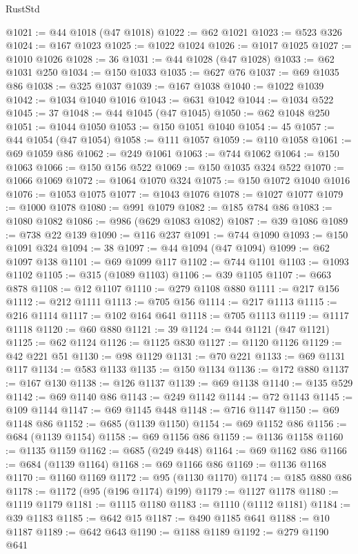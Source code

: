 \begin{lexlean}{RustStd}
\begin{coremodule}
@1021 := @44 @1018 (@47 @1018)
@1022 := @62 @1021
@1023 := @523 @326
@1024 := @167 @1023
@1025 := @1022 @1024
@1026 := @1017 @1025
@1027 := @1010 @1026
@1028 := 36
@1031 := @44 @1028 (@47 @1028)
@1033 := @62 @1031 @250
@1034 := @150 @1033
@1035 := @627 @76
@1037 := @69 @1035 @86
@1038 := @325 @1037
@1039 := @167 @1038
@1040 := @1022 @1039
@1042 := @1034 @1040 @1016
@1043 := @631 @1042
@1044 := @1034 @522
@1045 := 37
@1048 := @44 @1045 (@47 @1045)
@1050 := @62 @1048 @250
@1051 := @1044 @1050
@1053 := @150 @1051 @1040
@1054 := 45
@1057 := @44 @1054 (@47 @1054)
@1058 := @111 @1057
@1059 := @110 @1058
@1061 := @69 @1059 @86
@1062 := @249 @1061
@1063 := @744 @1062
@1064 := @150 @1063
@1066 := @150 @156 @522
@1069 := @150 @1035 @324 @522
@1070 := @1066 @1069
@1072 := @1064 @1070 @324
@1075 := @150 @1072 @1040 @1016
@1076 := @1053 @1075
@1077 := @1043 @1076
@1078 := @1027 @1077
@1079 := @1000 @1078
@1080 := @991 @1079
@1082 := @185 @784 @86
@1083 := @1080 @1082
@1086 := @986 (@629 @1083 @1082)
@1087 := @39 @1086
@1089 := @738 @22 @139
@1090 := @116 @237
@1091 := @744 @1090
@1093 := @150 @1091 @324
@1094 := 38
@1097 := @44 @1094 (@47 @1094)
@1099 := @62 @1097 @138
@1101 := @69 @1099 @117
@1102 := @744 @1101
@1103 := @1093 @1102
@1105 := @315 (@1089 @1103)
@1106 := @39 @1105
@1107 := @663 @878
@1108 := @12 @1107
@1110 := @279 @1108 @880
@1111 := @217 @156
@1112 := @212 @1111
@1113 := @705 @156
@1114 := @217 @1113
@1115 := @216 @1114
@1117 := @102 @164 @641
@1118 := @705 @1113
@1119 := @1117 @1118
@1120 := @60 @880
@1121 := 39
@1124 := @44 @1121 (@47 @1121)
@1125 := @62 @1124
@1126 := @1125 @830
@1127 := @1120 @1126
@1129 := @42 @221 @51
@1130 := @98 @1129
@1131 := @70 @221
@1133 := @69 @1131 @117
@1134 := @583 @1133
@1135 := @150 @1134
@1136 := @172 @880
@1137 := @167 @130
@1138 := @126 @1137
@1139 := @69 @1138
@1140 := @135 @529
@1142 := @69 @1140 @86
@1143 := @249 @1142
@1144 := @72 @1143
@1145 := @109 @1144
@1147 := @69 @1145 @448
@1148 := @716 @1147
@1150 := @69 @1148 @86
@1152 := @685 (@1139 @1150)
@1154 := @69 @1152 @86
@1156 := @684 (@1139 @1154)
@1158 := @69 @1156 @86
@1159 := @1136 @1158
@1160 := @1135 @1159
@1162 := @685 (@249 @448)
@1164 := @69 @1162 @86
@1166 := @684 (@1139 @1164)
@1168 := @69 @1166 @86
@1169 := @1136 @1168
@1170 := @1160 @1169
@1172 := @95 (@1130 @1170)
@1174 := @185 @880 @86
@1178 := @1172 (@95 (@196 @1174) @199)
@1179 := @1127 @1178
@1180 := @1119 @1179
@1181 := @1115 @1180
@1183 := @1110 (@1112 @1181)
@1184 := @39 @1183
@1185 := @642 @15
@1187 := @490 @1185 @641
@1188 := @10 @1187
@1189 := @642 @643
@1190 := @1188 @1189
@1192 := @279 @1190 @641

\end{coremodule}
\end{lexlean}
